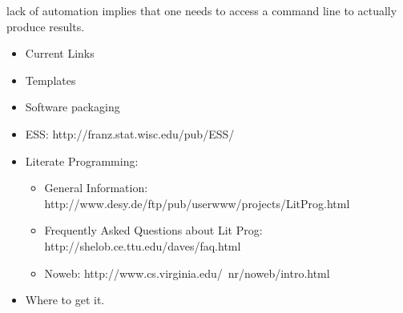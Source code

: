 \documentclass[semhelv]{seminar}
\begin{document}
lack of automation implies that one needs to access a command line to
actually produce results.
 
\begin{itemize}
\item Current Links
\end{itemize}

\begin{slide}

\end{slide}

\begin{itemize}
\item Templates
\item Software packaging
\end{itemize}

\begin{slide}

  \begin{itemize}
  \item ESS: http://franz.stat.wisc.edu/pub/ESS/
  \item Literate Programming:
    \begin{itemize}
    \item General Information:
      http://www.desy.de/ftp/pub/userwww/projects/LitProg.html 
    \item %
      Frequently Asked Questions about Lit Prog: http://shelob.ce.ttu.edu/daves/faq.html
    \item %
      Noweb: http://www.cs.virginia.edu/~nr/noweb/intro.html
    \end{itemize}
  \end{itemize}
\end{slide}

\begin{itemize}
\item Where to get it.
\end{itemize}
\end{document}
